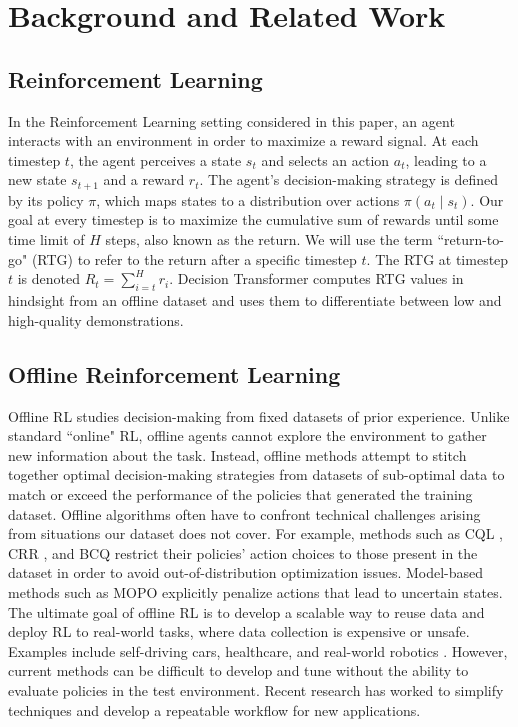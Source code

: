 
\section{Background and Related Work}
\label{sec:relatedwork}

\subsection{Reinforcement Learning}
In the Reinforcement Learning  setting considered in this paper, an agent interacts with an environment in order to maximize a reward signal. At each timestep $t$, the agent perceives a state $s_t$ and selects an action $a_t$, leading to a new state $s_{t+1}$ and a reward $r_t$. The agent's decision-making strategy is defined by its policy $\pi$, which maps states to a distribution over actions $\pi(a_t \mid s_t)$. Our goal at every timestep is to maximize the cumulative sum of rewards until some time limit of $H$ steps, also known as the return. We will use the term ``return-to-go" (RTG) to refer to the return after a specific timestep $t$. The RTG at timestep $t$ is denoted $\hat{R}_t = \mathop{\sum}_{i=t}^{H}r_i$. Decision Transformer computes RTG values in hindsight from an offline dataset and uses them to differentiate between low and high-quality demonstrations.

\subsection{Offline Reinforcement Learning}
Offline RL \cite{levine2020offline} studies decision-making from fixed datasets of prior experience. Unlike standard ``online" RL, offline agents cannot explore the environment to gather new information about the task. Instead, offline methods attempt to stitch together optimal decision-making strategies from datasets of sub-optimal data to match or exceed the performance of the policies that generated the training dataset. Offline algorithms often have to confront technical challenges 
arising from situations our dataset does not cover. For example, methods such as CQL \cite{kumar2020conservative}, CRR \cite{NEURIPS2020_588cb956}, and BCQ \cite{fujimoto2019off} restrict their policies' action choices to those present in the dataset in order to avoid out-of-distribution optimization issues. Model-based methods such as MOPO \cite{yu2020mopo} explicitly penalize actions that lead to uncertain states. The ultimate goal of offline RL is to develop a scalable way to reuse data and deploy RL to real-world tasks, where data collection is expensive or unsafe. Examples include self-driving cars, healthcare, and real-world robotics \cite{levine2020offline}. However, current methods can be difficult to develop and tune without the ability to evaluate policies in the test environment. Recent research has worked to simplify techniques \cite{fujimoto2021minimalist} and develop a repeatable workflow \cite{kumar2021workflow} for new applications.


